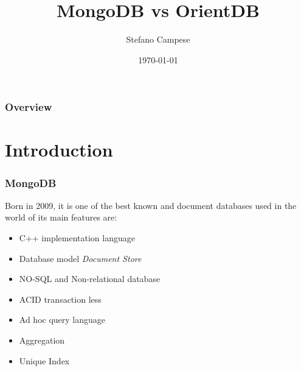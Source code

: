 \documentclass{beamer}
\title[MongoDB vs OrientDB]{MongoDB vs OrientDB} %
\author{Stefano Campese} %
\date{\today} %
\begin{document}
\begin{frame}
\titlepage %
\end{frame}

\begin{frame}
\frametitle{Overview} %
\tableofcontents %
\end{frame}


\section{Introduction} %


\begin{frame}
\frametitle{MongoDB}
Born in 2009, it is one of the best known and document databases used in the world of its main features are:
\begin{itemize}
\item C++ implementation language 
\item Database model \emph{Document Store}
\item NO-SQL and Non-relational database
\item ACID transaction less
\item Ad hoc query language
\item Aggregation
\item Unique Index
\end{itemize}
\end{frame}
\end{document}
